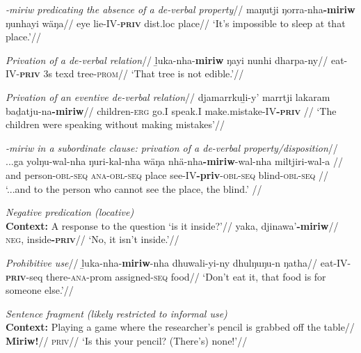 \a\begingl\glpreamble\textit{\emph{-miriw} predicating the absence of a de-verbal property}//
\gla maŋutji ŋorra-nha\textbf{-miriw} ŋunhayi wäŋa//
\glb eye lie-IV\textsc{-\textbf{priv}} \gls{dist}.\gls{loc} place//
\glft`It's impossible to sleep at that place.'//\endgl


\a\begingl\glpreamble \textit{Privation of a de-verbal relation}// %
\gla ḻuka-nha-\textbf{miriw} ŋayi nunhi dharpa-ny//
\glb eat-IV-\textsc{\textbf{priv}} 3s \gls{texd} tree-\textsc{prom}//
\glft`That tree is not edible.'//\endgl


\a\begingl\glpreamble \textit{Privation of an eventive de-verbal relation}//
\gla djamarrkuḻi-y' marrtji lakaram baḏatju-na\textbf{-miriw}//
\glb children-\textsc{erg} go.I speak.I make.mistake-IV\textsc{\textbf{-priv}}	//
\glft `The children were speaking without making mistakes'//\endgl


\a\begingl\glpreamble \textit{\emph{-miriw} in a subordinate clause: privation of a de-verbal property/disposition}//
\gla ...ga yolŋu-wal-nha ŋuri-kal-nha wäŋa nhä-nha\textbf{-miriw}-wal-nha miltjiri-wal-a   //
\glb and person\textsc{-\gls{obl}-seq} \textsc{ana-obl-seq} place see-IV\textbf{-\gls{priv}}-\textsc{obl-seq} blind\textsc{-obl-seq}	//
\glft`...and to the person who cannot see the place, the blind.' 			//\endgl

\a\begingl\glpreamble\textit{Negative predication (locative)}\\ \textbf{Context:} A response to the question `is it inside?'//
\gla yaka, djinawa'\textbf{-miriw}//
\glb \textsc{neg}, inside\textsc{\textbf{-priv}}//
\glft`No, it isn't inside.'//\endgl

\a\begingl\glpreamble\textit{ Prohibitive use}//
\gla ḻuka-nha-\textbf{miriw}-nha dhuwali-yi-ny dhulŋuŋu-n ŋatha//
\glb eat-IV-\textsc{\textbf{priv}}-\gls{seq} there-\textsc{ana}-\gls{prom} assigned-\textsc{seq} food//
\glft`Don't eat it, that food is for someone else.'//\endgl

\a\begingl\glpreamble\textit{Sentence fragment (likely restricted to informal use)}\\ \textbf{Context:} Playing a game where the researcher's pencil is grabbed off the table//
\gla {} \textbf{Miriw!}//
\glb \textsc{priv}//
\glft `Is this your pencil? (There's) none!'\trailingcitation{[AW~20180731]}//\endgl


